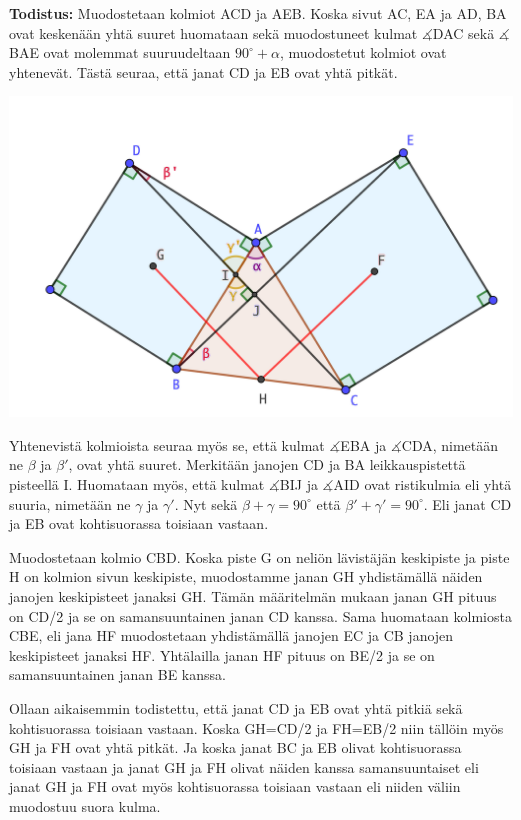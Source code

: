 \documentclass{scrartcl}
\begin{document}
\textbf{Todistus:} Muodostetaan kolmiot ACD ja AEB. Koska sivut AC, EA ja AD, BA ovat keskenään yhtä suuret huomataan sekä muodostuneet kulmat $\measuredangle$DAC sekä $\measuredangle$BAE ovat molemmat suuruudeltaan $90^\circ + \alpha$, muodostetut kolmiot ovat yhtenevät. Tästä seuraa, että janat CD ja EB ovat yhtä pitkät.
\begin{center}
    \includegraphics[scale=0.6]{kolmiojatkoa}
\end{center}

Yhtenevistä kolmioista seuraa myös se, että kulmat $\measuredangle$EBA ja $\measuredangle$CDA, nimetään ne $\beta$ ja $\beta'$, ovat yhtä suuret. Merkitään janojen CD ja BA leikkauspistettä pisteellä I. Huomataan myös, että kulmat $\measuredangle$BIJ ja $\measuredangle$AID ovat ristikulmia eli yhtä suuria, nimetään ne $\gamma$ ja $\gamma'$. Nyt sekä $\beta + \gamma = 90^\circ$ että $\beta' + \gamma' = 90^\circ$. Eli janat CD ja EB ovat kohtisuorassa toisiaan vastaan.

Muodostetaan kolmio CBD. Koska piste G on neliön lävistäjän keskipiste ja piste H on kolmion sivun keskipiste, muodostamme janan GH yhdistämällä näiden janojen keskipisteet janaksi GH. Tämän määritelmän mukaan janan GH pituus on CD/2 ja se on samansuuntainen janan CD kanssa. Sama huomataan kolmiosta CBE, eli jana HF muodostetaan yhdistämällä janojen EC ja CB janojen keskipisteet janaksi HF. Yhtälailla janan HF pituus on BE/2 ja se on samansuuntainen janan BE kanssa.

Ollaan aikaisemmin todistettu, että janat CD ja EB ovat yhtä pitkiä sekä kohtisuorassa toisiaan vastaan. Koska GH=CD/2 ja FH=EB/2 niin tällöin myös GH ja FH ovat yhtä pitkät. Ja koska janat BC ja EB olivat kohtisuorassa toisiaan vastaan ja janat GH ja FH olivat näiden kanssa samansuuntaiset eli janat GH ja FH ovat myös kohtisuorassa toisiaan vastaan eli niiden väliin muodostuu suora kulma.
\end{document}
